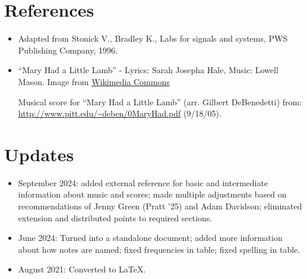 \documentclass[12pt]{article}
\begin{document}
\section{References}
\begin{itemize}
\item Adapted from Stonick V., Bradley K., Labs for signals and systems, PWS Publishing Company, 1996.   
\item ``Mary Had a Little Lamb'' - Lyrics: Sarah Josepha Hale, Music: Lowell Mason.  Image from \href{https://commons.wikimedia.org/wiki/File:Mary_Had_a_Little_Lamb.jpeg}{Wikimedia Commons}

Musical score for ``Mary Had a Little Lamb'' (arr. Gilbert DeBenedetti) from:\\ \url{http://www.pitt.edu/~deben/0MaryHad.pdf} (9/18/05).
\end{itemize} 
\section{Updates}
\begin{itemize}
\item September 2024: added external reference for basic and intermediate information about music and scores; made multiple adjustments based on recommendations of Jenny Green (Pratt '25) and Adam Davidson; eliminated extension and distributed points to required sections.
\item June 2024: Turned into a standalone document; added more information about how notes are named; fixed frequencies in table; fixed spelling in table.
\item August 2021: Converted to \LaTeX.
\end{itemize}
\clearpage
\end{document}
